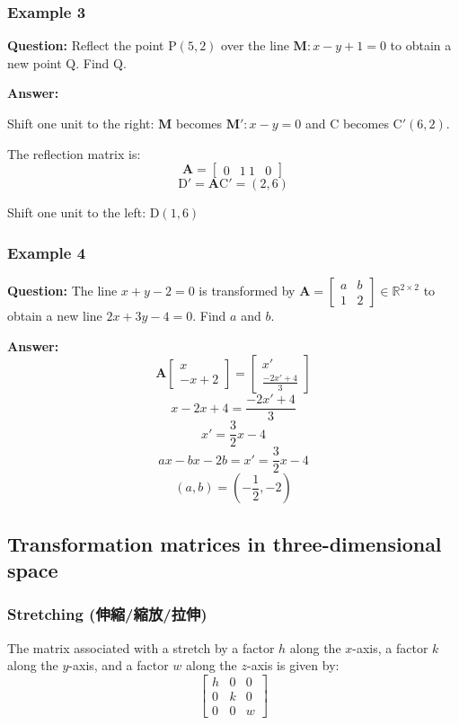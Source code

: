 \documentclass[a4paper,12pt]{report}
\begin{document}
\subsubsection{Example 3}
\textbf{Question:} Reflect the point $\mathrm{P}(5, 2)$ over the line $\mathbf{M}: x - y + 1 = 0$ to obtain a new point $\mathrm{Q}$. Find $\mathrm{Q}$.

\textbf{Answer:} 

Shift one unit to the right: $\mathbf{M}$ becomes $\mathbf{M}':x - y = 0$ and $\mathrm{C}$ becomes $\mathrm{C}'(6, 2)$.

The reflection matrix is: 
\[\mathbf{A} = \begin{bmatrix} 0 & 1 \ 1 & 0 \end{bmatrix}\]
\[\mathrm{D}' = \mathbf{A} \mathrm{C}' = (2, 6)\]

Shift one unit to the left: $\mathrm{D}(1, 6)$
\subsubsection{Example 4}
\textbf{Question:} The line $x+y-2=0$ is transformed by $\mathbf{A}=\begin{bmatrix}a&b\\1&2\end{bmatrix}\in\mathbb{R}^{2\times 2}$ to obtain a new line $2x+3y-4=0$. Find $a$ and $b$.

\textbf{Answer:} 
\[\mathbf{A}\begin{bmatrix}x\\ -x+2\end{bmatrix}=\begin{bmatrix}x'\\ \frac{-2x'+4}{3}\end{bmatrix}\]
\[x-2x+4=\frac{-2x'+4}{3}\]
\[x'=\frac{3}{2}x-4\]
\[ax-bx-2b=x'=\frac{3}{2}x-4\]
\[(a, b)=(-\frac{1}{2}, -2)\]
\subsection{Transformation matrices in three-dimensional space}
\subsubsection{Stretching (伸縮/縮放/拉伸)}
The matrix associated with a stretch by a factor $h$ along the $x$-axis, a factor $k$ along the $y$-axis, and a factor $w$ along the $z$-axis is given by:
\[\begin{bmatrix}
h & 0 & 0 \\
0 & k & 0 \\
0 & 0 & w
\end{bmatrix}\]
\end{document}
